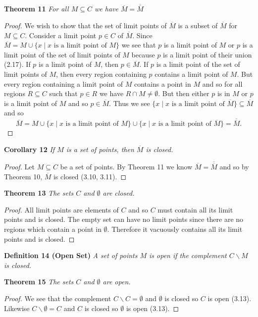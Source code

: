 \documentclass{article}
\begin{document}
\begin{flushleft}
\textbf{Theorem 11}
\textsl{For all $M \subseteq C$ we have $\overline{M} = \overline{\overline{M}}$}
\begin{proof}
We wish to show that the set of limit points of $\overline{M}$ is a subset of $\overline{M}$ for $M \subseteq C$. Consider a limit point $p \in C$ of $\overline{M}$. Since $\overline{M} = M \cup \{x \mid x \text{ is a limit point of }M\}$ we see that $p$ is a limit point of $M$ or $p$ is a limit point of the set of limit points of $M$ because $p$ is a limit point of their union (2.17). If $p$ is a limit point of $M$, then $p \in \overline{M}$. If $p$ is a limit point of the set of limit points of $M$, then every region containing $p$ contains a limit point of $M$. But every region containing a limit point of $M$ contains a point in $M$ and so for all regions $R \subseteq C$ such that $p \in R$ we have $R \cap M \neq \emptyset$. But then either $p$ is in $M$ or $p$ is a limit point of $M$ and so $p \in \overline{M}$. Thus we see $\{x \mid x \text{ is a limit point of } \overline{M}\} \subseteq \overline{M}$ and so
\[
\overline{M} = M \cup \{x \mid x \text{ is a limit point of }M\} \cup \{x \mid x \text{ is a limit point of }\overline{M}\} = \overline{\overline{M}}.
\]
\end{proof}

\textbf{Corollary 12}
\textsl{If $M$ is a set of points, then $\overline{M}$ is closed.}
\begin{proof}
Let $M \subseteq C$ be a set of points. By Theorem 11 we know $\overline{M} = \overline{\overline{M}}$ and so by Theorem 10, $\overline{M}$ is closed (3.10, 3.11).
\end{proof}

\textbf{Theorem 13}
\textsl{The sets $C$ and $\emptyset$ are closed.}
\begin{proof}
All limit points are elements of $C$ and so $C$ must contain all its limit points and is closed. The empty set can have no limit points since there are no regions which contain a point in $\emptyset$. Therefore it vacuously contains all its limit points and is closed.
\end{proof}

\textbf{Definition 14 (Open Set)}
\textsl{A set of points $M$ is open if the complement $C \backslash M$ is closed.}\newline

\textbf{Theorem 15}
\textsl{The sets $C$ and $\emptyset$ are open.}
\begin{proof}
We see that the complement $C \backslash C = \emptyset$ and $\emptyset$ is closed so $C$ is open (3.13). Likewise $C \backslash \emptyset = C$ and $C$ is closed so $\emptyset$ is open (3.13).
\end{proof}


\end{flushleft}
\end{document}
